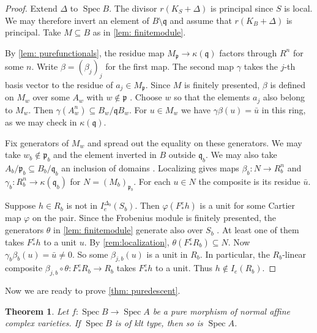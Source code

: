 \documentclass[11pt,leqno]{amsart}
\numberwithin{equation}{section}
\newtheorem{theorem}{Theorem}[section]
\theoremstyle{definition}
\theoremstyle{remark}
\newcommand{\Spec}{\operatorname{Spec}}
\newcommand{\stacktag}[1]{\href{https://stacks.math.columbia.edu/tag/#1}{#1}}
\begin{document}
\begin{proof}
Extend $\Delta$ to $\Spec B$. The divisor $r(K_S + \Delta)$ is principal since $S$ is local. We may therefore invert an element of $B \setminus \mathfrak{q}$ and assume that $r(K_B + \Delta)$ is principal. Take $M \subseteq B$ as in \cref{lem: finitemodule}.

By \cref{lem: purefunctionals}, the residue map $M_{\mathfrak{p}} \to \kappa(\mathfrak{q})$ factors through $R^n$ for some $n$. Write $\beta=(\beta_j)_j$ for the first map. The second map $\gamma$ takes the $j$-th basis vector to the residue of $a_j\in M_{\mathfrak{p}}$. Since $M$ is finitely presented, $\beta$ is defined on $M_w$ over some $A_w$ with $w \notin \mathfrak{p}$ \cite[\stacktag{0583}]{stacks-project}. Choose $w$ so that the elements $a_j$ also belong to $M_w$. Then $\gamma(A_w^n) \subseteq B_w/\mathfrak{q}B_w$. For $u \in M_w$ we have $\gamma\beta(u) = \bar u$ in this ring, as we may check in $\kappa(\mathfrak{q})$.

Fix generators of $M_w$ and spread out the equality on these generators. We may take $w_b \notin \mathfrak{p}_b$ and the element inverted in $B$ outside $\mathfrak{q}_b$. We may also take $A_b/\mathfrak{p}_b \subseteq B_b/\mathfrak{q}_b$ an inclusion of domains \cite[Chapter 6, Lemma 1.12 and Proposition 1.16(h)]{SSbook}.
Localizing gives maps $\beta_b:N \to R_b^n$ and $\gamma_b:R_b^n \to \kappa(\mathfrak{q}_b)$ for $N = (M_b)_{\mathfrak{p}_b}$. For each $u \in N$ the composite is its residue $\bar u$.

Suppose $h \in R_b$ is not in $I_e^{\Delta_b}(S_b)$. Then $\varphi(F^e_*h)$ is a unit for some Cartier map $\varphi$ on the pair. Since the Frobenius module is finitely presented, the generators $\theta$ in \cref{lem: finitemodule} generate also over $S_b$ \cite[\stacktag{0583}]{stacks-project}. At least one of them takes $F^e_*h$ to a unit $u$. By \cref{rem:localization}, $\theta(F^e_*R_b) \subseteq N$. Now $\gamma_b\beta_b(u) = \bar u \ne 0$. So some $\beta_{j,b}(u)$ is a unit in $R_b$. In particular, the $R_b$-linear composite $\beta_{j,b} \circ \theta:F^e_*R_b \to R_b$ takes $F^e_*h$ to a unit. Thus $h \notin I_e(R_b)$.
\end{proof}

Now we are ready to prove \cref{thm: puredescent}. 

\begin{theorem}
    Let $f: \Spec B \to \Spec A$ be a pure morphism of normal affine complex varieties. If $\Spec B$ is of klt type, then so is $\Spec A$.
\end{theorem}
\end{document}
